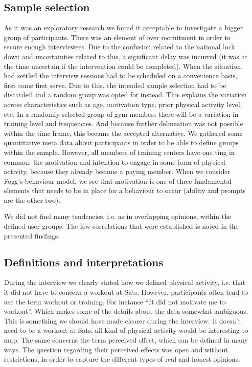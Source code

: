 
\subsection{Sample selection}
As it was an exploratory research we found it acceptable to investigate a bigger group of participants. There was an element of over recruitment in order to secure enough interviewees. Due to the confusion related to the national lock down and uncertainties related to this, a significant delay was incurred (it was at the time uncertain if the intervention could be completed). When the situation had settled the interview sessions had to be scheduled on a convenience basis, first come first serve. Due to this, the intended sample selection had to be discarded and a random group was opted for instead. This explains the variation across characteristics such as age, motivation type, prior physical activity level, etc. In a randomly selected group of gym members there will be a variation in training level and frequencies. And because further delineation was not possible within the time frame, this became the accepted alternative. We gathered some quantitative meta data about participants in order to be able to define groups within the sample. However, all members of training centers have one ting in common; the motivation and intention to engage in some form of physical activity, because they already became a paying member. When we consider Fogg's behaviour model, we see that motivation is one of three fundamental elements that needs to be in place for a behaviour to occur (ability and prompts are the other two). 

We did not find many tendencies, i.e. as in overlapping opinions, within the defined user groups. The few correlations that were established is noted in the presented findings. 


\subsection{Definitions and interpretations }
During the interview we clearly stated how we defined physical activity, i.e. that it did not have to concern a workout at Sats. However, participants often tend to use the term workout or training. For instance “It did not motivate me to workout”. Which makes some of the details about the data somewhat ambiguous. This is something we should have made clearer during the interview: it doesn't need to be a workout at Sats, all kind of physical activity would be interesting to map. The same concerns the term perceived effect, which can be defined in many ways. The question regarding their perceived effects was open and without restrictions, in order to capture the different types of real and honest opinions.


